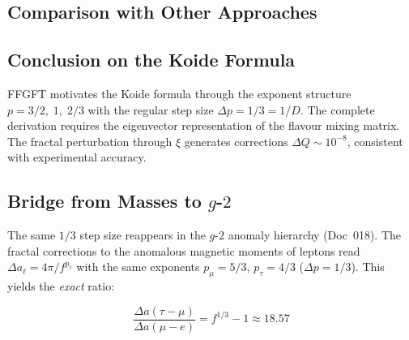 	\subsection*{Comparison with Other Approaches}
	
	\begin{center}
		\small
	\end{center}
	
	\subsection*{Conclusion on the Koide Formula}
	
	FFGFT motivates the Koide formula through the exponent structure \(p = 3/2,\; 1,\; 2/3\) with the regular step size \(\Delta p = 1/3 = 1/D\). The complete derivation requires the eigenvector representation of the flavour mixing matrix. The fractal perturbation through \(\xi\) generates corrections \(\Delta Q \sim 10^{-8}\), consistent with experimental accuracy.
	
	\subsection*{Bridge from Masses to \(g\)-\(2\)}
	
	The same \(1/3\) step size reappears in the \(g\)-\(2\) anomaly hierarchy (Doc~018). The fractal corrections to the anomalous magnetic moments of leptons read \(\Delta a_\ell = 4\pi/f^{p_\ell}\) with the same exponents \(p_\mu = 5/3\), \(p_\tau = 4/3\) (\(\Delta p = 1/3\)). This yields the \textit{exact} ratio:
	
	\begin{equation}
		\frac{\Delta a(\tau - \mu)}{\Delta a(\mu - e)} = f^{1/3} - 1 \approx 18.57
	\end{equation}
	
